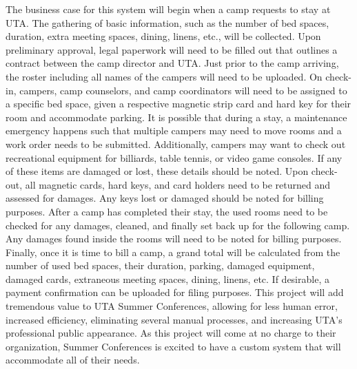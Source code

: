 The business case for this system will begin when a camp requests to stay at UTA. The gathering of basic information, such as the number of bed spaces, duration, extra meeting spaces, dining, linens, etc., will be collected. Upon preliminary approval, legal paperwork will need to be filled out that outlines a contract between the camp director and UTA. Just prior to the camp arriving, the roster including all names of the campers will need to be uploaded. On check-in, campers, camp counselors, and camp coordinators will need to be assigned to a specific bed space, given a respective magnetic strip card and hard key for their room and accommodate parking. It is possible that during a stay, a maintenance emergency happens such that multiple campers may need to move rooms and a work order needs to be submitted. Additionally, campers may want to check out recreational equipment for billiards, table tennis, or video game consoles. If any of these items are damaged or lost, these details should be noted. Upon check-out, all magnetic cards, hard keys, and card holders need to be returned and assessed for damages. Any keys lost or damaged should be noted for billing purposes. After a camp has completed their stay, the used rooms need to be checked for any damages, cleaned, and finally set back up for the following camp. Any damages found inside the rooms will need to be noted for billing purposes. Finally, once it is time to bill a camp, a grand total will be calculated from the number of used bed spaces, their duration, parking, damaged equipment, damaged cards, extraneous meeting spaces, dining, linens, etc. If desirable, a payment confirmation can be uploaded for filing purposes.
This project will add tremendous value to UTA Summer Conferences, allowing for less human error, increased efficiency, eliminating several manual processes, and increasing UTA’s professional public appearance. As this project will come at no charge to their organization, Summer Conferences is excited to have a custom system that will accommodate all of their needs.
